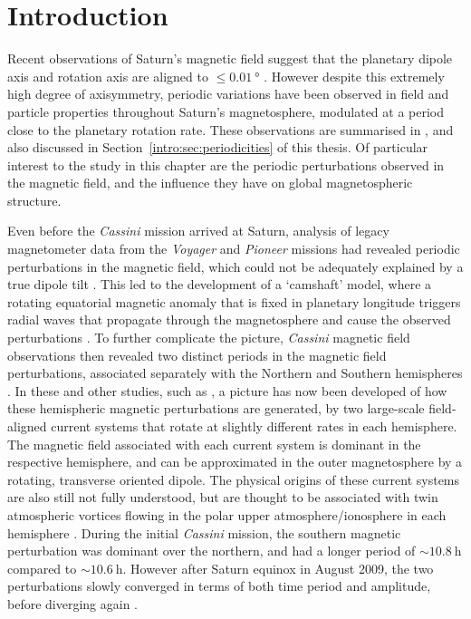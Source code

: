 \section{Introduction}\label{equinox:sec:intro}
Recent observations of Saturn's magnetic field suggest that the planetary dipole axis and rotation axis are aligned to $\leq\SI{0.01}{\degree}$ \citep{dougherty2018}. However despite this extremely high degree of axisymmetry, periodic variations have been observed in field and particle properties throughout Saturn's magnetosphere, modulated at a period close to the planetary rotation rate. These observations are summarised in \citet{carbary2013}, and also discussed in Section~\ref{intro:sec:periodicities} of this thesis. Of particular interest to the study in this chapter are  the periodic perturbations observed in the magnetic field, and the influence  they have on global magnetospheric structure.

Even before the \textit{Cassini} mission arrived at Saturn, analysis of legacy magnetometer data from the \textit{Voyager} and \textit{Pioneer} missions had revealed periodic perturbations in the magnetic field, which could not be adequately explained by a true dipole tilt \citet{espinosa2000}. This led to the development of a `camshaft' model, where a rotating equatorial magnetic anomaly that is fixed in planetary longitude triggers radial waves that propagate through the magnetosphere and cause the observed perturbations \citep{espinosa2003b}. To further complicate the picture, \textit{Cassini} magnetic field observations then revealed two distinct periods in the magnetic field perturbations, associated separately with the Northern and Southern hemispheres \citep[e.g.][]{andrews2010,provan2012}. In these and other studies, such as \citet{hunt2014}, a picture has now been developed of how these hemispheric magnetic perturbations are generated, by two large-scale field-aligned current systems that rotate at slightly different rates in each hemisphere. The magnetic field associated with each current system is dominant in the respective hemisphere, and can be approximated in the outer magnetosphere by a rotating, transverse oriented dipole. The physical origins of these current systems are also still not fully understood, but are thought to be associated with twin atmospheric vortices flowing in the polar upper atmosphere/ionosphere in each hemisphere \citep{jiaandkivelson2012, southwood2014, smith2016}. During the initial \textit{Cassini} mission, the southern magnetic perturbation was dominant over the northern, and had a longer period of ${\sim}\SI{10.8}{\hour}$ compared to ${\sim}\SI{10.6}{\hour}$. However after Saturn equinox in August 2009, the two perturbations slowly converged in terms of both time period and amplitude, before diverging again \citep{andrews2012}.

